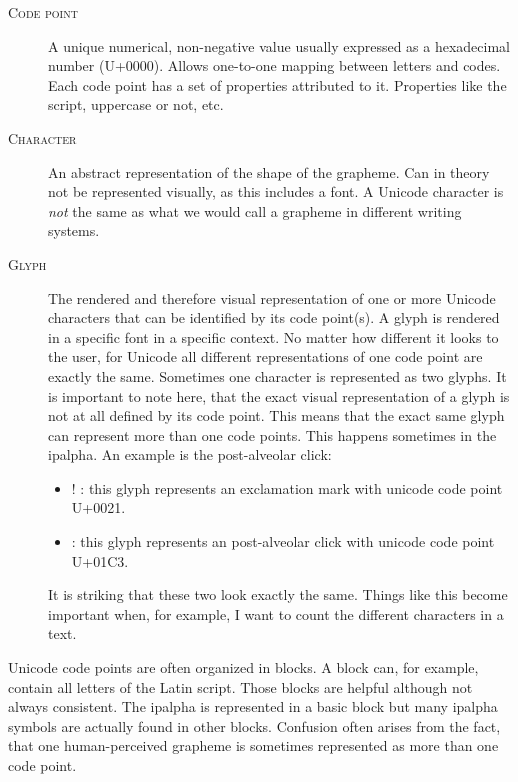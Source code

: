\begin{description}
\item[\textsc{Code point}] A unique numerical, non-negative value usually expressed as a hexadecimal number (U+0000). Allows one-to-one mapping between letters and codes. Each code point has a set of properties attributed to it. Properties like the script, uppercase or not, etc.
\item[\textsc{Character}] An abstract representation of the shape of the grapheme. Can in theory not be represented visually, as this includes a font. A Unicode character is \textit{not} the same as what we would call a grapheme in different writing systems.
\item[\textsc{Glyph}] The rendered and therefore visual representation of one or more Unicode characters that can be identified by its code point(s). A glyph is rendered in a specific font in a specific context. No matter how different it looks to the user, for Unicode all different representations of one code point are exactly the same. Sometimes one character is represented as two glyphs. It is important to note here, that the exact visual representation of a glyph is not at all defined by its code point. This means that the exact same glyph can represent more than one code points. This happens sometimes in the \ac{ipalpha}. An example is the post-alveolar click:

\begin{itemize}
\item ! : this glyph represents an exclamation mark with unicode code point U+0021.
\item \textipa{!} : this glyph represents an post-alveolar click with unicode code point U+01C3.
\end{itemize}

It is striking that these two look exactly the same. Things like this become important when, for example, I want to count the different characters in a text.

\end{description}

Unicode code points are often organized in blocks. A block can, for example, contain all letters of the Latin script. Those blocks are helpful although not always consistent. The \ac{ipalpha} is represented in a basic block but many \ac{ipalpha} symbols are actually found in other blocks. Confusion often arises from the fact, that one human-perceived grapheme is sometimes represented as more than one code point. 

